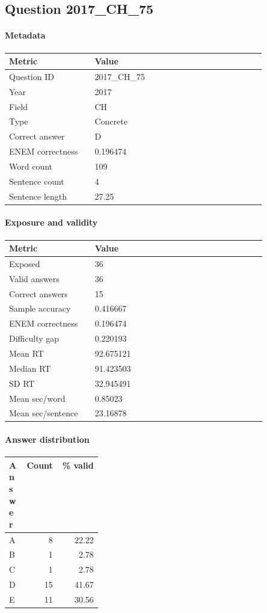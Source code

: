 \subsection*{Question 2017\_CH\_75}
\label{sec:q_2017_CH_75}
\paragraph{Metadata}
\begin{tabular}{p{0.30\linewidth}p{0.60\linewidth}}
\toprule
Metric & Value\\
\midrule
Question ID & 2017\_CH\_75\\
Year & 2017\\
Field & CH\\
Type & Concrete\\
Correct answer & D\\
ENEM correctness & 0.196474\\
Word count & 109\\
Sentence count & 4\\
Sentence length & 27.25\\
\bottomrule
\end{tabular}

\paragraph{Exposure and validity}
\begin{tabular}{p{0.30\linewidth}p{0.60\linewidth}}
\toprule
Metric & Value\\
\midrule
Exposed & 36\\
Valid answers & 36\\
Correct answers & 15\\
Sample accuracy & 0.416667\\
ENEM correctness & 0.196474\\
Difficulty gap & 0.220193\\
Mean RT & 92.675121\\
Median RT & 91.423503\\
SD RT & 32.945491\\
Mean sec/word & 0.85023\\
Mean sec/sentence & 23.16878\\
\bottomrule
\end{tabular}

\paragraph{Answer distribution}
\begin{tabular}{p{0.18\linewidth}rr}
\toprule
Answer & Count & \% valid\\
\midrule
A & 8 & 22.22\\
B & 1 & 2.78\\
C & 1 & 2.78\\
D & 15 & 41.67\\
E & 11 & 30.56\\
\bottomrule
\end{tabular}

